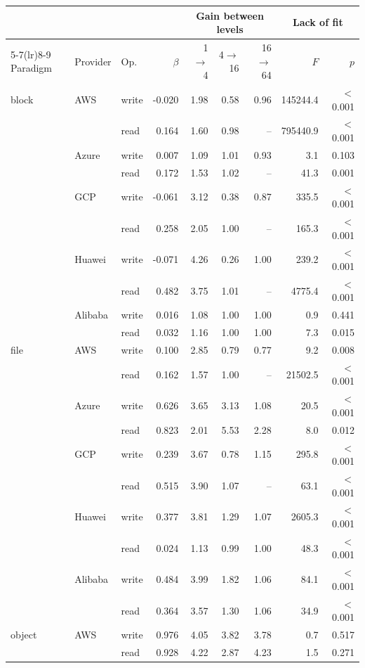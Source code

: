 \begin{tabular}{lllrrrrrr}
\toprule
 & & & & \multicolumn{3}{c}{Gain between levels} & \multicolumn{2}{c}{Lack of fit} \\
\cmidrule(lr){5-7}\cmidrule(lr){8-9}
Paradigm & Provider & Op. & $\beta$ & 1$\to$4 & 4$\to$16 & 16$\to$64 & $F$ & $p$ \\
\midrule
block & AWS & write & -0.020 & 1.98 & 0.58 & 0.96 & 145244.4 & $<$0.001 \\
 &  & read & 0.164 & 1.60 & 0.98 & -- & 795440.9 & $<$0.001 \\
 & Azure & write & 0.007 & 1.09 & 1.01 & 0.93 & 3.1 & 0.103 \\
 &  & read & 0.172 & 1.53 & 1.02 & -- & 41.3 & 0.001 \\
 & GCP & write & -0.061 & 3.12 & 0.38 & 0.87 & 335.5 & $<$0.001 \\
 &  & read & 0.258 & 2.05 & 1.00 & -- & 165.3 & $<$0.001 \\
 & Huawei & write & -0.071 & 4.26 & 0.26 & 1.00 & 239.2 & $<$0.001 \\
 &  & read & 0.482 & 3.75 & 1.01 & -- & 4775.4 & $<$0.001 \\
 & Alibaba & write & 0.016 & 1.08 & 1.00 & 1.00 & 0.9 & 0.441 \\
 &  & read & 0.032 & 1.16 & 1.00 & 1.00 & 7.3 & 0.015 \\
\midrule
file & AWS & write & 0.100 & 2.85 & 0.79 & 0.77 & 9.2 & 0.008 \\
 &  & read & 0.162 & 1.57 & 1.00 & -- & 21502.5 & $<$0.001 \\
 & Azure & write & 0.626 & 3.65 & 3.13 & 1.08 & 20.5 & $<$0.001 \\
 &  & read & 0.823 & 2.01 & 5.53 & 2.28 & 8.0 & 0.012 \\
 & GCP & write & 0.239 & 3.67 & 0.78 & 1.15 & 295.8 & $<$0.001 \\
 &  & read & 0.515 & 3.90 & 1.07 & -- & 63.1 & $<$0.001 \\
 & Huawei & write & 0.377 & 3.81 & 1.29 & 1.07 & 2605.3 & $<$0.001 \\
 &  & read & 0.024 & 1.13 & 0.99 & 1.00 & 48.3 & $<$0.001 \\
 & Alibaba & write & 0.484 & 3.99 & 1.82 & 1.06 & 84.1 & $<$0.001 \\
 &  & read & 0.364 & 3.57 & 1.30 & 1.06 & 34.9 & $<$0.001 \\
\midrule
object & AWS & write & 0.976 & 4.05 & 3.82 & 3.78 & 0.7 & 0.517 \\
 &  & read & 0.928 & 4.22 & 2.87 & 4.23 & 1.5 & 0.271 \\

\end{tabular}
